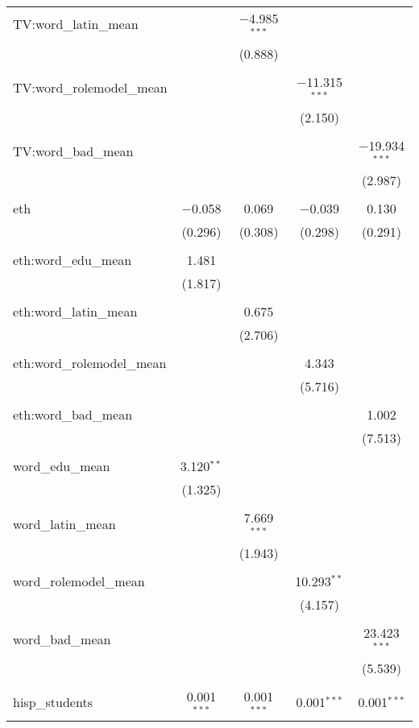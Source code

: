 \begin{table}[!htbp]
\begin{tabular}{@{\extracolsep{-2pt}}lcccc}
 TV:word\_latin\_mean &  & $-$4.985$^{***}$ &  &  \\ 
  &  & (0.888) &  &  \\ 
  & & & & \\ 
 TV:word\_rolemodel\_mean &  &  & $-$11.315$^{***}$ &  \\ 
  &  &  & (2.150) &  \\ 
  & & & & \\ 
 TV:word\_bad\_mean &  &  &  & $-$19.934$^{***}$ \\ 
  &  &  &  & (2.987) \\ 
  & & & & \\ 
 eth & $-$0.058 & 0.069 & $-$0.039 & 0.130 \\ 
  & (0.296) & (0.308) & (0.298) & (0.291) \\ 
  & & & & \\ 
 eth:word\_edu\_mean & 1.481 &  &  &  \\ 
  & (1.817) &  &  &  \\ 
  & & & & \\ 
 eth:word\_latin\_mean &  & 0.675 &  &  \\ 
  &  & (2.706) &  &  \\ 
  & & & & \\ 
 eth:word\_rolemodel\_mean &  &  & 4.343 &  \\ 
  &  &  & (5.716) &  \\ 
  & & & & \\ 
 eth:word\_bad\_mean &  &  &  & 1.002 \\ 
  &  &  &  & (7.513) \\ 
  & & & & \\ 
 word\_edu\_mean & 3.120$^{**}$ &  &  &  \\ 
  & (1.325) &  &  &  \\ 
  & & & & \\ 
 word\_latin\_mean &  & 7.669$^{***}$ &  &  \\ 
  &  & (1.943) &  &  \\ 
  & & & & \\ 
 word\_rolemodel\_mean &  &  & 10.293$^{**}$ &  \\ 
  &  &  & (4.157) &  \\ 
  & & & & \\ 
 word\_bad\_mean &  &  &  & 23.423$^{***}$ \\ 
  &  &  &  & (5.539) \\ 
  & & & & \\ 
 hisp\_students & 0.001$^{***}$ & 0.001$^{***}$ & 0.001$^{***}$ & 0.001$^{***}$ \\ 

\end{tabular}
\end{table}

